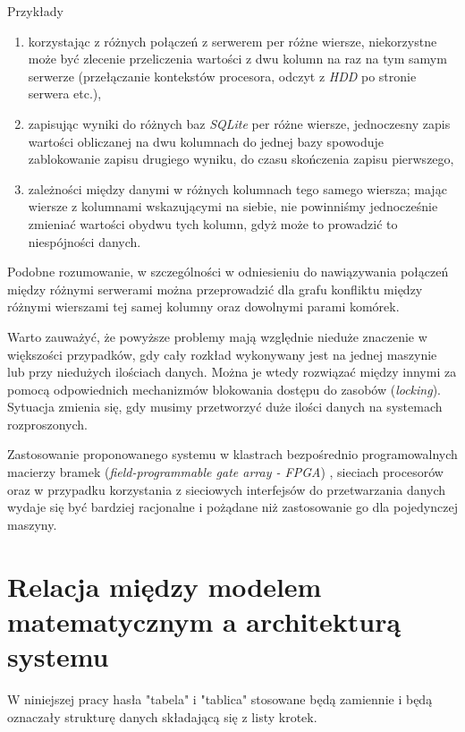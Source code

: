 \documentclass[brudnopis]{xmgr}
\begin{document}
Przykłady
\begin{enumerate}
    \item korzystając z różnych połączeń z serwerem per różne wiersze, niekorzystne może być zlecenie przeliczenia wartości z dwu kolumn na raz na tym samym serwerze (przełączanie kontekstów procesora, odczyt z \emph{HDD} po stronie serwera etc.),
    \item zapisując wyniki do różnych baz \emph{SQLite} per różne wiersze, jednoczesny zapis wartości obliczanej na dwu kolumnach do jednej bazy spowoduje zablokowanie zapisu drugiego wyniku, do czasu skończenia zapisu pierwszego,
    \item zależności między danymi w różnych kolumnach tego samego wiersza; mając wiersze z kolumnami wskazującymi na siebie, nie powinniśmy jednocześnie zmieniać wartości obydwu tych kolumn, gdyż może to prowadzić to niespójności danych.
\end{enumerate}
\medskip

Podobne rozumowanie, w szczególności w odniesieniu do nawiązywania połączeń między różnymi serwerami można przeprowadzić dla grafu konfliktu między różnymi wierszami tej samej kolumny oraz dowolnymi parami komórek.
\medskip

Warto zauważyć, że powyższe problemy mają względnie nieduże znaczenie w większości przypadków, gdy cały rozkład wykonywany jest na jednej maszynie lub przy niedużych ilościach danych. Można je wtedy rozwiązać między innymi za pomocą odpowiednich mechanizmów blokowania dostępu do zasobów (\emph{locking}).
Sytuacja zmienia się, gdy musimy przetworzyć duże ilości danych na systemach rozproszonych.
\medskip

Zastosowanie proponowanego systemu w klastrach bezpośrednio programowalnych macierzy bramek (\emph{field-programmable gate array - FPGA}) \cite{sadrozinski2016applications}, sieciach procesorów oraz w przypadku korzystania z sieciowych interfejsów do przetwarzania danych wydaje się być bardziej racjonalne i pożądane niż zastosowanie go dla pojedynczej maszyny.



\chapter{Relacja między modelem matematycznym a architekturą systemu}

W niniejszej pracy hasła "tabela" i "tablica" stosowane będą zamiennie i będą oznaczały strukturę danych składającą się z listy krotek. 
\medskip
\end{document}
